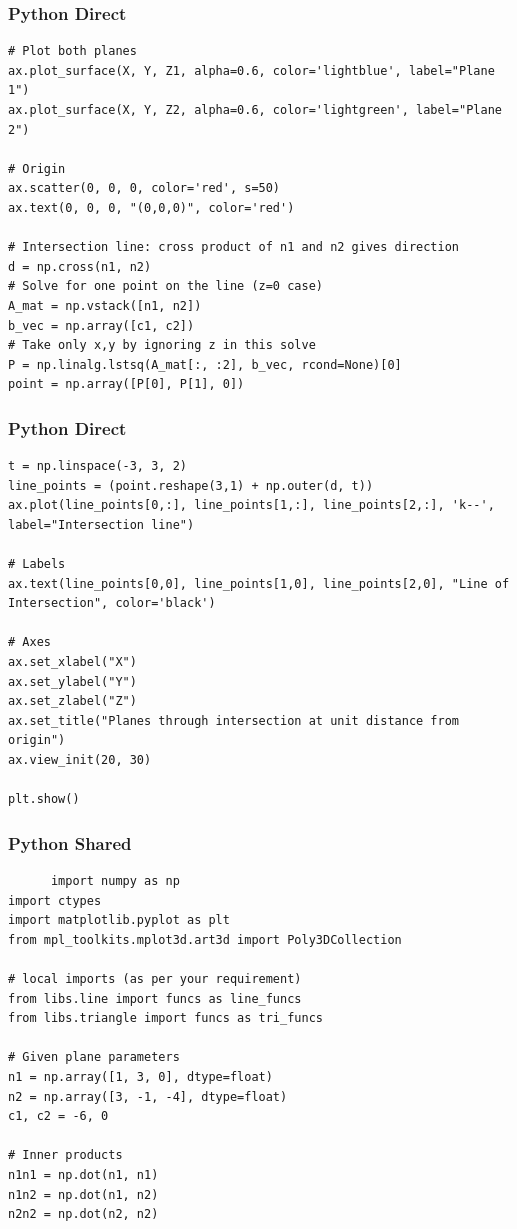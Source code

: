 \documentclass{beamer}
\begin{document}
\begin{frame}[fragile]
      \frametitle{Python Direct}
      \begin{lstlisting}
# Plot both planes
ax.plot_surface(X, Y, Z1, alpha=0.6, color='lightblue', label="Plane 1")
ax.plot_surface(X, Y, Z2, alpha=0.6, color='lightgreen', label="Plane 2")

# Origin
ax.scatter(0, 0, 0, color='red', s=50)
ax.text(0, 0, 0, "(0,0,0)", color='red')

# Intersection line: cross product of n1 and n2 gives direction
d = np.cross(n1, n2)
# Solve for one point on the line (z=0 case)
A_mat = np.vstack([n1, n2])
b_vec = np.array([c1, c2])
# Take only x,y by ignoring z in this solve
P = np.linalg.lstsq(A_mat[:, :2], b_vec, rcond=None)[0]
point = np.array([P[0], P[1], 0])
\end{lstlisting}
\end{frame}
\begin{frame}[fragile]
      \frametitle{Python Direct}
      \begin{lstlisting}
t = np.linspace(-3, 3, 2)
line_points = (point.reshape(3,1) + np.outer(d, t))
ax.plot(line_points[0,:], line_points[1,:], line_points[2,:], 'k--', label="Intersection line")

# Labels
ax.text(line_points[0,0], line_points[1,0], line_points[2,0], "Line of Intersection", color='black')

# Axes
ax.set_xlabel("X")
ax.set_ylabel("Y")
ax.set_zlabel("Z")
ax.set_title("Planes through intersection at unit distance from origin")
ax.view_init(20, 30)

plt.show()

\end{lstlisting}
\end{frame}
\begin{frame}[fragile]
      \frametitle{Python Shared}
      \begin{lstlisting}
      import numpy as np
import ctypes
import matplotlib.pyplot as plt
from mpl_toolkits.mplot3d.art3d import Poly3DCollection

# local imports (as per your requirement)
from libs.line import funcs as line_funcs
from libs.triangle import funcs as tri_funcs

# Given plane parameters
n1 = np.array([1, 3, 0], dtype=float)
n2 = np.array([3, -1, -4], dtype=float)
c1, c2 = -6, 0

# Inner products
n1n1 = np.dot(n1, n1)
n1n2 = np.dot(n1, n2)
n2n2 = np.dot(n2, n2)
\end{lstlisting}
\end{frame}
\end{document}
